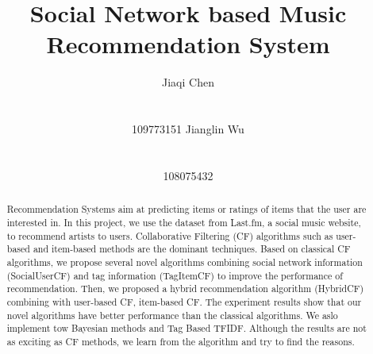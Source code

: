 \documentclass{sig-alternate}
\begin{document}
\title{Social Network based Music Recommendation System}

\author{
\alignauthor
Jiaqi Chen\\
       \\
       \\
      109773151
\alignauthor
Jianglin Wu\\
       \\
       \\
      108075432
}
\maketitle
\begin{abstract}
Recommendation Systems aim at predicting items or ratings of items that the user are interested in. In this project, we use the dataset from Last.fm, a social music website, to recommend artists to users. Collaborative Filtering (CF) algorithms such as user-based and item-based methods are the dominant techniques. Based on classical CF algorithms, we propose several novel algorithms combining social network information (SocialUserCF) and tag information (TagItemCF) to improve the performance of recommendation. Then, we proposed a hybrid recommendation algorithm (HybridCF) combining with user-based CF, item-based CF. The experiment results show that our novel algorithms have better performance than the classical  algorithms.  We aslo implement tow Bayesian methods and Tag Based TFIDF.  Although the results are not as exciting as CF methods, we learn from the algorithm and try to find the reasons. 
\end{abstract}

\end{document}
